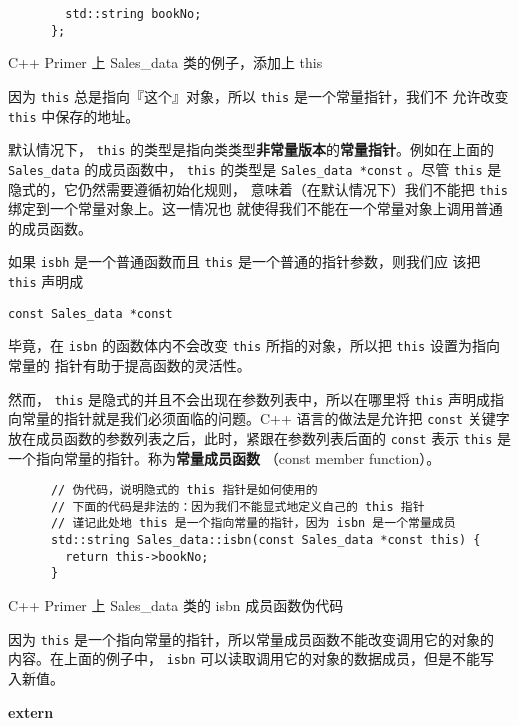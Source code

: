 \begin{itemize}
\begin{sourcecode}[hbtp]
\begin{Verbatim}
        std::string bookNo;
      };
    \end{Verbatim}
    \caption{C++ Primer 上 Sales\_data 类的例子，添加上 this}
  \end{sourcecode}

  因为 \verb|this| 总是指向『这个』对象，所以 \verb|this| 是一个常量指针，我们不
  允许改变 \verb|this| 中保存的地址。

  默认情况下， \verb|this| 的类型是指向类类型\textbf{非常量版本}的\textbf{常量指针}。例如在上面的
  \verb|Sales_data| 的成员函数中， \verb|this| 的类型是
  \verb|Sales_data *const| 。尽管 \verb|this| 是隐式的，它仍然需要遵循初始化规则，
  意味着（在默认情况下）我们不能把 \verb|this| 绑定到一个常量对象上。这一情况也
  就使得我们不能在一个常量对象上调用普通的成员函数。

  如果 \verb|isbh| 是一个普通函数而且 \verb|this| 是一个普通的指针参数，则我们应
  该把 \verb|this| 声明成

  \qquad \verb|const Sales_data *const|

  毕竟，在 \verb|isbn|
  的函数体内不会改变 \verb|this| 所指的对象，所以把 \verb|this| 设置为指向常量的
  指针有助于提高函数的灵活性。

  然而， \verb|this| 是隐式的并且不会出现在参数列表中，所以在哪里将 \verb|this|
  声明成指向常量的指针就是我们必须面临的问题。C++ 语言的做法是允许把
  \verb|const| 关键字放在成员函数的参数列表之后，此时，紧跟在参数列表后面的
  \verb|const| 表示 \verb|this| 是一个指向常量的指针。称为\textbf{常量成员函数}
  （const member function）。

  \begin{sourcecode}[hbtp]
    \begin{Verbatim}
      // 伪代码，说明隐式的 this 指针是如何使用的
      // 下面的代码是非法的：因为我们不能显式地定义自己的 this 指针
      // 谨记此处地 this 是一个指向常量的指针，因为 isbn 是一个常量成员
      std::string Sales_data::isbn(const Sales_data *const this) {
        return this->bookNo;
      }
    \end{Verbatim}
    \caption{C++ Primer 上 Sales\_data 类的 isbn 成员函数伪代码}
  \end{sourcecode}

  因为 \verb|this| 是一个指向常量的指针，所以常量成员函数不能改变调用它的对象的
  内容。在上面的例子中， \verb|isbn| 可以读取调用它的对象的数据成员，但是不能写
  入新值。
  
\end{itemize}

\noindent\textbf{extern}

